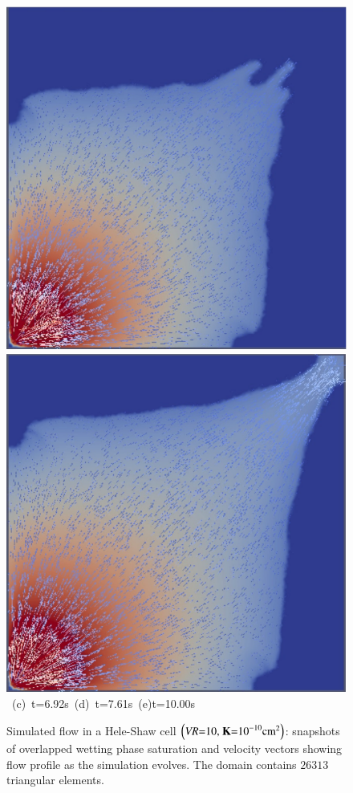 \begin{landscape}
\begin{figure}[ht]
{{      \includegraphics[width=.5\textwidth]{./Pics1/Saffman_homogeneous_VR10/ST_Homog_VR10_D2201c.pdf}
      \includegraphics[width=.51\textwidth]{./Pics1/Saffman_homogeneous_VR10/ST_Homog_VR10_D3001c.pdf}}
\vspace{0.cm}
\hbox{ \hspace{2.cm} (c) t=6.92s \hspace{4.5cm} (d) t=7.61s \hspace{5.cm} (e)t=10.00s}
\vspace{0.cm}
}   
\caption{Simulated flow in a Hele-Shaw cell $\left(\text{{\it VR}=10, {\bf K}=10}^{-10}\text{cm}^{2}\right)$: snapshots of overlapped wetting phase saturation and velocity vectors showing flow profile as the simulation evolves. The domain contains $26313$  triangular elements.}
\label{fig:homoheleshaw_VN10}
\end{figure}
\end{landscape}
\clearpage

